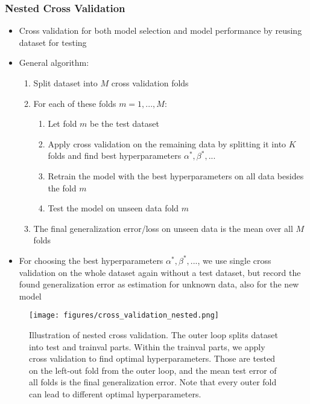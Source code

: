 \subsubsection{Nested Cross Validation}
\begin{itemize}
	\item Cross validation for both model selection and model performance by reusing dataset for testing
	\item General algorithm:
	\begin{enumerate}
		\item Split dataset into $M$ cross validation folds
		\item For each of these folds $m=1,...,M$:
		\begin{enumerate}
			\item Let fold $m$ be the test dataset
			\item Apply cross validation on the remaining data by splitting it into $K$ folds and find best hyperparameters $\alpha^*,\beta^*,...$
			\item Retrain the model with the best hyperparameters on all data besides the fold $m$
			\item Test the model on unseen data fold $m$ 
		\end{enumerate}
		\item The final generalization error/loss on unseen data is the mean over all $M$ folds
	\end{enumerate}
	\item For choosing the best hyperparameters $\alpha^*,\beta^*,...$, we use single cross validation on the whole dataset again without a test dataset, but record the found generalization error as estimation for unknown data, also for the new model
\end{itemize}
\begin{figure}[ht]
	\centering
	\texttt{[image: figures/cross\_validation\_nested.png]}
	\caption{Illustration of nested cross validation. The outer loop splits dataset into test and trainval parts. Within the trainval parts, we apply cross validation to find optimal hyperparameters. Those are tested on the left-out fold from the outer loop, and the mean test error of all folds is the final generalization error. Note that every outer fold can lead to different optimal hyperparameters.}
	\label{img:linear_regression_nested_cross_validation}
\end{figure}

